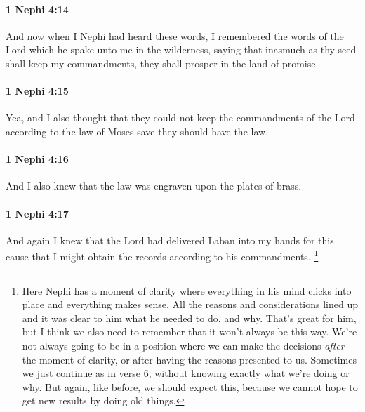 		\paragraph{1 Nephi 4:14} %
			\label{1NEPHI-4-14}

			And now when I Nephi had heard these words,
			I remembered the words of the Lord
			which he spake unto me in the wilderness,
			saying that inasmuch as thy seed shall keep my commandments,
			they shall prosper in the land of promise.

		\paragraph{1 Nephi 4:15} %
			\label{1NEPHI-4-15}

			Yea, and I also thought that they could not keep the commandments of the Lord
			according to the law of Moses save they should have the law.

		\paragraph{1 Nephi 4:16} %
			\label{1NEPHI-4-16}

			And I also knew that the law was engraven upon the plates of brass.

		\paragraph{1 Nephi 4:17} %
			\label{1NEPHI-4-17}

			And again I knew that the Lord had delivered Laban into my hands for this cause
			that I might obtain the records according to his commandments.%
				\footnote{%
					\label{1NEPHI-4-17-NOTE-knew}%
					Here Nephi has a moment of clarity where everything in his mind clicks into place and everything makes sense. All the reasons and considerations lined up and it was clear to him what he needed to do, and why. That's great for him, but I think we also need to remember that it won't always be this way. We're not always going to be in a position where we can make the decisions \textit{after} the moment of clarity, or after having the reasons presented to us. Sometimes we just continue as in verse 6, without knowing exactly what we're doing or why. But again, like before, we should expect this, because we cannot hope to get new results by doing old things.
					}

